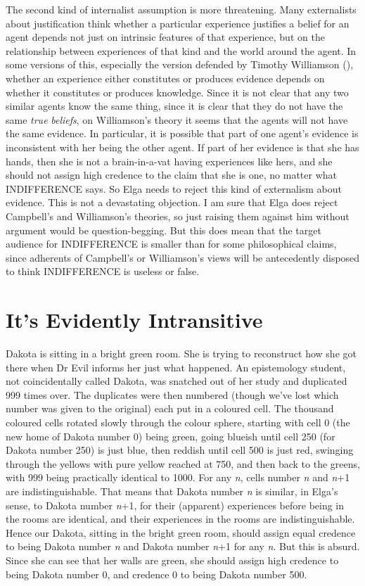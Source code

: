 \documentclass[
  11pt,
  letterpaper,
  DIV=11,
  numbers=noendperiod,
  oneside]{scrartcl}
\begin{document}
The second kind of internalist assumption is more threatening. Many
externalists about justification think whether a particular experience
justifies a belief for an agent depends not just on intrinsic features
of that experience, but on the relationship between experiences of that
kind and the world around the agent. In some versions of this,
especially the version defended by Timothy Williamson
(), whether an experience
either constitutes or produces evidence depends on whether it
constitutes or produces knowledge. Since it is not clear that any two
similar agents know the same thing, since it is clear that they do not
have the same \emph{true} \emph{beliefs}, on Williamson's theory it
seems that the agents will not have the same evidence. In particular, it
is possible that part of one agent's evidence is inconsistent with her
being the other agent. If part of her evidence is that she has hands,
then she is not a brain-in-a-vat having experiences like hers, and she
should not assign high credence to the claim that she is one, no matter
what INDIFFERENCE says. So Elga needs to reject this kind of externalism
about evidence. This is not a devastating objection. I am sure that Elga
does reject Campbell's and Williamson's theories, so just raising them
against him without argument would be question-begging. But this does
mean that the target audience for INDIFFERENCE is smaller than for some
philosophical claims, since adherents of Campbell's or Williamson's
views will be antecedently disposed to think INDIFFERENCE is useless or
false.

\section{It's Evidently Intransitive}\label{its-evidently-intransitive}

Dakota is sitting in a bright green room. She is trying to reconstruct
how she got there when Dr Evil informs her just what happened. An
epistemology student, not coincidentally called Dakota, was snatched out
of her study and duplicated 999 times over. The duplicates were then
numbered (though we've lost which number was given to the original) each
put in a coloured cell. The thousand coloured cells rotated slowly
through the colour sphere, starting with cell 0 (the new home of Dakota
number 0) being green, going blueish until cell 250 (for Dakota number
250) is just blue, then reddish until cell 500 is just red, swinging
through the yellows with pure yellow reached at 750, and then back to
the greens, with 999 being practically identical to 1000. For any
\emph{n}, cells number \emph{n} and \emph{n}+1 are indistinguishable.
That means that Dakota number \emph{n} is similar, in Elga's sense, to
Dakota number \emph{n}+1, for their (apparent) experiences before being
in the rooms are identical, and their experiences in the rooms are
indistinguishable. Hence our Dakota, sitting in the bright green room,
should assign equal credence to being Dakota number \emph{n} and Dakota
number \emph{n}+1 for any \emph{n}. But this is absurd. Since she can
see that her walls are green, she should assign high credence to being
Dakota number 0, and credence 0 to being Dakota number 500.
\end{document}

